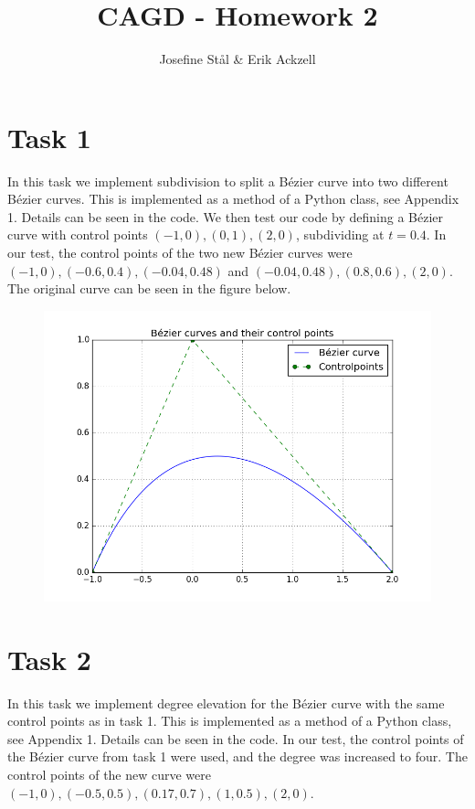 \documentclass[]{article}
\title{CAGD - Homework 2}
\author{Josefine St{\aa}l \& Erik Ackzell}
\begin{document}
\maketitle
\section*{Task 1}
In this task we implement subdivision to split a B\'ezier curve into two different B\'ezier curves. This is implemented as a method of a Python class, see Appendix 1. Details can be seen in the code. We then test our code by defining a B\'ezier curve with control points $(-1, 0), (0, 1), (2, 0)$, subdividing at $t=0.4$. In our test, the control points of the two new B\'ezier curves were $(-1, 0), (-0.6, 0.4), (-0.04, 0.48)$ and $(-0.04, 0.48), (0.8, 0.6), (2, 0)$. The original curve can be seen in the figure below.
\begin{figure}[h!]
	\includegraphics[scale=0.6]{beziercurvefig}
\end{figure}

\section*{Task 2}
In this task we implement degree elevation for the B\'ezier curve with the same control points as in task 1. This is implemented as a method of a Python class, see Appendix 1. Details can be seen in the code. In our test, the control points of the B\'ezier curve from task 1 were used, and the degree was increased to four. The control points of the new curve were $(-1, 0), (-0.5, 0.5), (0.17, 0.7), (1, 0.5), (2, 0)$.
\end{document}
